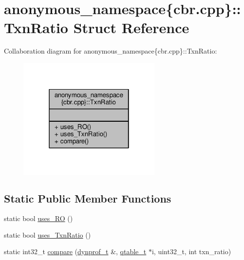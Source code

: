 \hypertarget{structanonymous__namespace_02cbr_8cpp_03_1_1TxnRatio}{\section{anonymous\-\_\-namespace\{cbr.\-cpp\}\-:\-:Txn\-Ratio Struct Reference}
\label{structanonymous__namespace_02cbr_8cpp_03_1_1TxnRatio}
}


Collaboration diagram for anonymous\-\_\-namespace\{cbr.\-cpp\}\-:\-:Txn\-Ratio\-:
\nopagebreak
\begin{figure}[H]
\begin{center}
\leavevmode
\includegraphics[width=202pt]{structanonymous__namespace_02cbr_8cpp_03_1_1TxnRatio__coll__graph}
\end{center}
\end{figure}
\subsection*{Static Public Member Functions}
\begin{DoxyCompactItemize}
\item 
static bool \hyperlink{structanonymous__namespace_02cbr_8cpp_03_1_1TxnRatio_afc7447702d49b8d9362c1b8980e74191}{uses\-\_\-\-R\-O} ()
\item 
static bool \hyperlink{structanonymous__namespace_02cbr_8cpp_03_1_1TxnRatio_aa37cd76f3b00ba1df4e4faab6bd5cc06}{uses\-\_\-\-Txn\-Ratio} ()
\item 
static int32\-\_\-t \hyperlink{structanonymous__namespace_02cbr_8cpp_03_1_1TxnRatio_aeac35cfba5cb0e91ab68d62821f746ea}{compare} (\hyperlink{structstm_1_1dynprof__t}{dynprof\-\_\-t} \&, \hyperlink{structstm_1_1qtable__t}{qtable\-\_\-t} $\ast$i, uint32\-\_\-t, int txn\-\_\-ratio)
\end{DoxyCompactItemize}


